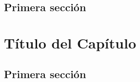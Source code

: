 \documentclass[12pt,a4paper,oneside,]{article}
\def\ifdoblecara{} %
\let\ifdoblecara\undefined %
\def\ifprincipal{} %
\numberwithin{dummy}{section}
\theoremstyle{ocrenumbox}
\theoremstyle{blacknumex}
\theoremstyle{blacknumbox}
\theoremstyle{ocrenum}
\theoremstyle{ocrenum}
\begin{document}
\hypertarget{primera-secciuxf3n-1}{%
\subsection{Primera sección}\label{primera-secciuxf3n-1}}

\FloatBarrier

\ifdefined\ifprincipal
\else
\setlength{\parindent}{1em}
\pagestyle{fancy}
\setcounter{tocdepth}{4}
\tableofcontents

\nocite{Luque2017,Luque2019,RStudio,R-base2,
R-knitr,R-rmarkdown,R-dplyr,R-ggplot2,Techopedia}

\fi

\ifdefined\ifdoblecara
\fancyhead{}{}
\fancyhead[LE,RO]{\scriptsize\rightmark}
\fancyfoot[LO,RE]{\scriptsize\slshape \leftmark}
\fancyfoot[C]{}
\fancyfoot[LE,RO]{\footnotesize\thepage}
\else
\fancyhead{}{}
\fancyhead[RO]{\scriptsize\rightmark}
\fancyfoot[LO]{\scriptsize\slshape \leftmark}
\fancyfoot[C]{}
\fancyfoot[RO]{\footnotesize\thepage}
\fi

\renewcommand{\headrulewidth}{0.4pt}
\renewcommand{\footrulewidth}{0.4pt}

\hypertarget{tuxedtulo-del-capuxedtulo-2}{%
\section{Título del Capítulo}\label{tuxedtulo-del-capuxedtulo-2}}

\hypertarget{primera-secciuxf3n-2}{%
\subsection{Primera sección}\label{primera-secciuxf3n-2}}

\FloatBarrier

\ifdefined\ifprincipal
\else
\setlength{\parindent}{1em}
\pagestyle{fancy}
\setcounter{tocdepth}{4}
\tableofcontents

\nocite{Luque2017,Luque2019,RStudio,R-base2,
R-knitr,R-rmarkdown,R-dplyr,R-ggplot2,Techopedia}

\fi

\ifdefined\ifdoblecara
\fancyhead{}{}
\fancyhead[LE,RO]{\scriptsize\rightmark}
\fancyfoot[LO,RE]{\scriptsize\slshape \leftmark}
\fancyfoot[C]{}
\fancyfoot[LE,RO]{\footnotesize\thepage}
\else
\fancyhead{}{}
\fancyhead[RO]{\scriptsize\rightmark}
\fancyfoot[LO]{\scriptsize\slshape \leftmark}
\fancyfoot[C]{}
\fancyfoot[RO]{\footnotesize\thepage}
\fi

\renewcommand{\headrulewidth}{0.4pt}
\renewcommand{\footrulewidth}{0.4pt}
\end{document}

